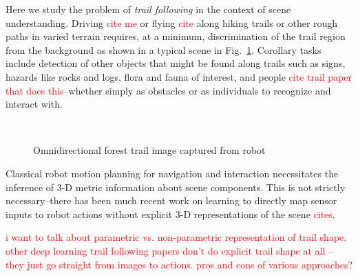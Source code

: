 \documentclass[letterpaper, 10 pt, conference]{ieeeconf}  %
\newcommand{\comment}[1]{\textcolor{red}{#1}}
\begin{document}
Here we study the problem of \textit{trail following} in the context
of scene understanding.  Driving \comment{cite me} or flying
\comment{cite} along hiking trails or other rough paths in varied
terrain requires, at a minimum, discrimination of the trail region
from the background as shown in a typical scene in
Fig.~\ref{fig:raw_trail}.  Corollary tasks include detection of other
objects that might be found along trails such as signs, hazards like rocks and logs, flora and fauna of interest, and people \comment{cite trail paper that does this}--whether simply as obstacles or as individuals to recognize and interact with.


\begin{figure}[!t]
\captionsetup[subfigure]{labelformat=empty}
\\
\caption{Omnidirectional forest trail image captured from robot}
\label{fig:raw_trail}
\end{figure}


Classical robot motion planning for navigation and interaction
necessitates the inference of 3-D metric information about scene
components.  This is not strictly necessary--there has been much recent work
on learning to directly map sensor inputs to robot actions without explicit 3-D
representations of the scene \comment{cites}.

\comment{i want to talk about parametric vs. non-parametric
  representation of trail shape.  other deep learning trail following papers don't
  do explicit trail shape at all -- they just go straight from images
  to actions.  pros and cons of various approaches?}
\end{document}
